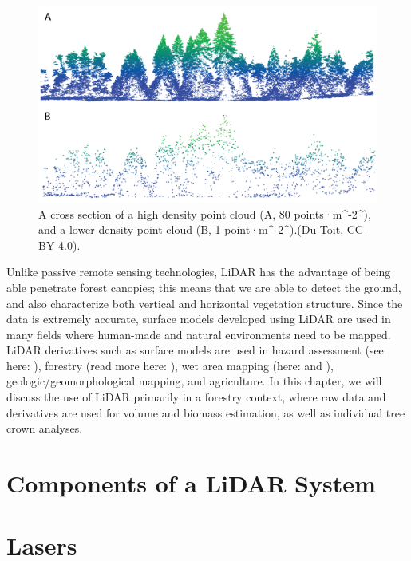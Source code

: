 \documentclass[
]{book}
\begin{document}
\begin{figure}
\includegraphics[width=0.8\linewidth]{images/15-high-low-point-density} \caption{A cross section of a high density point cloud (A, 80 points·m^-2^), and a lower density point cloud (B, 1 point·m^-2^).(Du Toit, CC-BY-4.0).}\label{fig:15-high-low-point-density}
\end{figure}

Unlike passive remote sensing technologies, LiDAR has the advantage of being able penetrate forest canopies; this means that we are able to detect the ground, and also characterize both vertical and horizontal vegetation structure. Since the data is extremely accurate, surface models developed using LiDAR are used in many fields where human-made and natural environments need to be mapped. LiDAR derivatives such as surface models are used in hazard assessment (see here: \citet{jaboyedoff_use_2012}), forestry (read more here: \citet{goodbody_airborne_2021}), wet area mapping (here: \citet{eash_stream-channel_2018} and \citet{zurqani_evaluating_2020}), geologic/geomorphological mapping, and agriculture. In this chapter, we will discuss the use of LiDAR primarily in a forestry context, where raw data and derivatives are used for volume and biomass estimation, as well as individual tree crown analyses.

\hypertarget{components-of-a-lidar-system}{%
\section{Components of a LiDAR System}\label{components-of-a-lidar-system}}

\hypertarget{lasers}{%
\section{Lasers}\label{lasers}}
\end{document}

